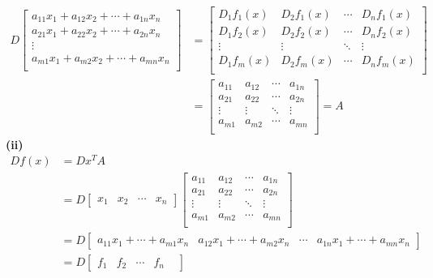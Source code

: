 \documentclass[letterpaper,12pt]{article}
\theoremstyle{definition}
\begin{document}
\begin{align*}
    D\begin{bmatrix}
        a_{11}x_1 +  a_{12}x_2 +  \cdots + a_{1n}x_n \\
        a_{21}x_1 + a_{22}x_2 + \cdots + a_{2n}x_n \\
        \vdots \\
        a_{m1}x_1 + a_{m2}x_2 + \cdots + a_{mn}x_n \\
    \end{bmatrix} 
    &=
    \begin{bmatrix}
    D_1f_1(x) &D_2f_1(x) & \cdots &D_nf_1(x)  \\
    D_1f_2(x) &D_2f_2(x) & \cdots &D_nf_2(x)  \\
    \vdots & \vdots & \ddots & \vdots \\
    D_1f_m(x) &D_2f_m(x) & \cdots &D_nf_m(x)  \\
    \end{bmatrix}
    \\ &=
    \begin{bmatrix}
        a_{11} & a_{12} & \cdots & a_{1n} \\
        a_{21} & a_{22} & \cdots & a_{2n} \\
        \vdots & \vdots & \ddots & \vdots \\
        a_{m1} & a_{m2} & \cdots & a_{mn} \\
    \end{bmatrix} = A
\end{align*}
\textbf{(ii)}\\
\begin{align*}
    Df(x) &= Dx^TA \\
    &=D
    \begin{bmatrix}
        x_1 & x_2 & \cdots & x_n 
    \end{bmatrix}
    \begin{bmatrix}
        a_{11} & a_{12} & \cdots & a_{1n} \\
        a_{21} & a_{22} & \cdots & a_{2n} \\
        \vdots & \vdots & \ddots & \vdots \\
        a_{m1} & a_{m2} & \cdots & a_{mn} \\
    \end{bmatrix}\\
    &= 
    D\begin{bmatrix}
        a_{11}x_1 + \cdots + a_{m1}x_n &
        a_{12}x_1 + \cdots + a_{m2}x_n &
        \cdots &
        a_{1n}x_1 + \cdots + a_{mn}x_n 
    \end{bmatrix}\\
    &= 
    D\begin{bmatrix}
        f_1 &
        f_2 &
        \cdots &
        f_n &
    \end{bmatrix}
\end{align*}
\end{document}
